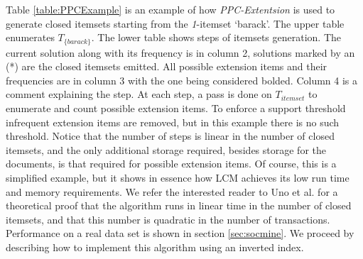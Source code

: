 \documentclass[letterpaper,12pt,titlepage,oneside,final]{book}
\begin{document}
Table \ref{table:PPCExample} is an example of how \emph{PPC-Extentsion} is
used to generate closed itemsets starting from the
\emph{1}-itemset `barack'.
The upper table enumerates $T_{\{barack\}}$.
The lower table shows steps of itemsets generation.
The current solution along with its frequency is in column 2,
solutions marked by an (*) are the closed itemsets emitted.
All possible extension items and their frequencies are in column 3 with the
one being considered bolded.
Column 4 is a comment explaining the step.
At each step, a pass is done on $T_{itemset}$ to enumerate and count possible
extension items.
To enforce a support threshold infrequent extension items are removed,
but in this example there is no such threshold.
Notice that the number of steps is linear in the number of closed itemsets,
and the only additional storage required, besides storage for the documents,
is that required for possible extension items.
Of course, this is a simplified example, but it shows in essence how LCM
achieves its low run time and memory requirements.
We refer the interested reader to Uno et al.\cite{uno2004lcm} for a
theoretical proof that the algorithm runs in linear time in the number of
closed itemsets,
and that this number is quadratic in the number of transactions.
Performance on a real data set is shown in section \ref{sec:socmine}.
We proceed by describing how to implement this algorithm using an inverted
index.
\end{document}
